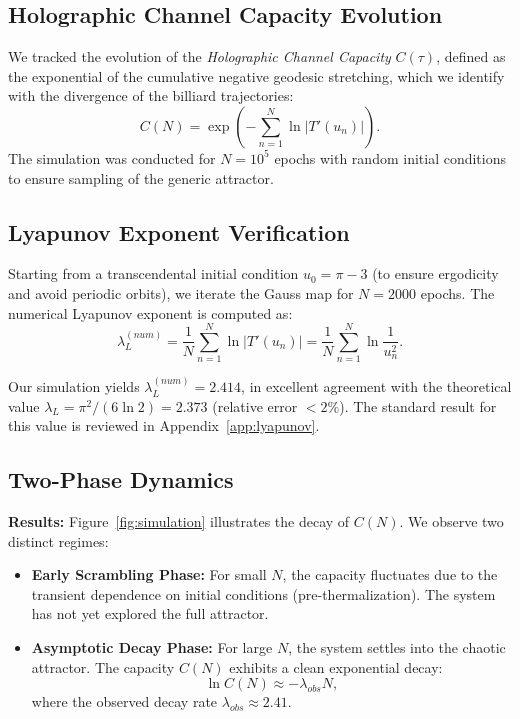\documentclass[aps,prd,reprint,nofootinbib,amsmath,amssymb,amsfonts]{revtex4-2}
\begin{document}
\subsection{Holographic Channel Capacity Evolution}

We tracked the evolution of the \textit{Holographic Channel Capacity} $C(\tau)$, defined as the exponential of the cumulative negative geodesic stretching, which we identify with the divergence of the billiard trajectories:
\begin{equation}
    C(N) = \exp \left( - \sum_{n=1}^{N} \ln |T'(u_n)| \right).
    \label{eq:channel_capacity}
\end{equation}
The simulation was conducted for $N = 10^5$ epochs with random initial conditions to ensure sampling of the generic attractor.

\subsection{Lyapunov Exponent Verification}

Starting from a transcendental initial condition $u_0 = \pi - 3$ (to ensure ergodicity and avoid periodic orbits), we iterate the Gauss map for $N = 2000$ epochs. The numerical Lyapunov exponent is computed as:
\begin{equation}
    \lambda_L^{(num)} = \frac{1}{N} \sum_{n=1}^N \ln |T'(u_n)| = \frac{1}{N} \sum_{n=1}^N \ln \frac{1}{u_n^2}.
\end{equation}

Our simulation yields $\lambda_L^{(num)} = 2.414$, in excellent agreement with the theoretical value $\lambda_L = \pi^2/(6\ln 2) = 2.373$ (relative error $< 2\%$). The standard result for this value is reviewed in Appendix~\ref{app:lyapunov}.

\subsection{Two-Phase Dynamics}

\textbf{Results:} Figure~\ref{fig:simulation} illustrates the decay of $C(N)$. We observe two distinct regimes:
\begin{itemize}
    \item \textbf{Early Scrambling Phase:} For small $N$, the capacity fluctuates due to the transient dependence on initial conditions (pre-thermalization). The system has not yet explored the full attractor.
    \item \textbf{Asymptotic Decay Phase:} For large $N$, the system settles into the chaotic attractor. The capacity $C(N)$ exhibits a clean exponential decay:
    \begin{equation}
        \ln C(N) \approx - \lambda_{obs} N,
    \end{equation}
    where the observed decay rate $\lambda_{obs} \approx 2.41$.
\end{itemize}
\end{document}
